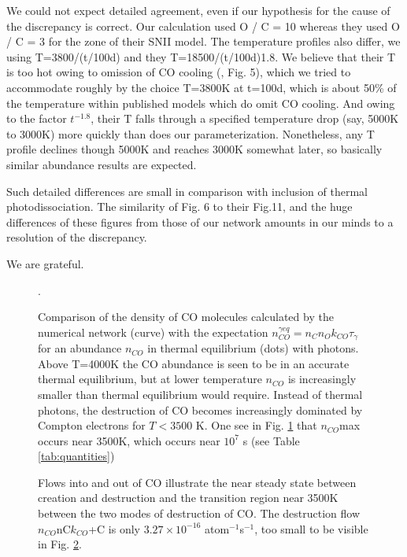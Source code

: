 \documentclass[manuscript]{aastex}
\newcommand{\ncogeq}{n_{CO}^{\gamma eq}}
\begin{document}
We could not expect detailed agreement, even if our hypothesis for the
cause of the discrepancy is correct. Our calculation used
O / C = 10 whereas they used O / C = 3 for the zone of their SNII model.
The temperature profiles also differ, we using T=3800/(t/100d) and they
T=18500/(t/100d)1.8.
We believe that their T is too hot owing to omission of CO cooling
(\citealp{1996ApJ...471..480L}, Fig. 5),
which we tried to accommodate roughly by
the choice T=3800K at t=100d, which is about 50\% of the temperature
within published models which do omit CO cooling. And owing to the
factor $t^{-1.8}$, their T falls through a specified temperature drop
(say, 5000K to 3000K) more quickly than does our parameterization.
Nonetheless, any T profile declines though 5000K and reaches 3000K
somewhat later, so basically similar abundance results are expected. 

Such detailed differences are small in comparison with inclusion of
thermal photodissociation. The similarity of Fig. 6 to their Fig.11,
and the huge differences of these figures from those of our network
amounts in our minds to a resolution of the discrepancy. 

\acknowledgments

We are grateful.

\clearpage

\begin{figure}
\caption{
Comparison of the density of CO molecules calculated by the numerical
network (curve) with the expectation $\ncogeq = n_C n_O k_{CO} \tau_\gamma$
for an abundance
$n_{CO}$ in thermal equilibrium (dots) with photons.
Above T=4000K the CO abundance is seen to be in an accurate thermal
equilibrium, but at lower temperature $n_{CO}$ is increasingly smaller than
thermal equilibrium would require. Instead of thermal photons,
the destruction of CO becomes increasingly dominated by
Compton electrons for $T < 3500$ K.
One see in Fig. \ref{fig:nco} that $n_{CO}$max occurs near 3500K,
which occurs near $10^7$ s (see Table \ref{tab:quantities})}. 
\label{fig:nco}
\end{figure}

\clearpage

\begin{figure}
\caption{
Flows into and out of CO illustrate the near steady state between creation
and destruction and the transition region near 3500K between the two modes
of destruction of CO. The destruction flow $n_{CO}$nC$k_{CO}$+C is only $3.27 \times
10^{-16}$ atom$^{-1}$s$^{-1}$, too small to be visible in Fig. \ref{fig:flows}. 
} \label{fig:flows}
\end{figure}
\end{document}
